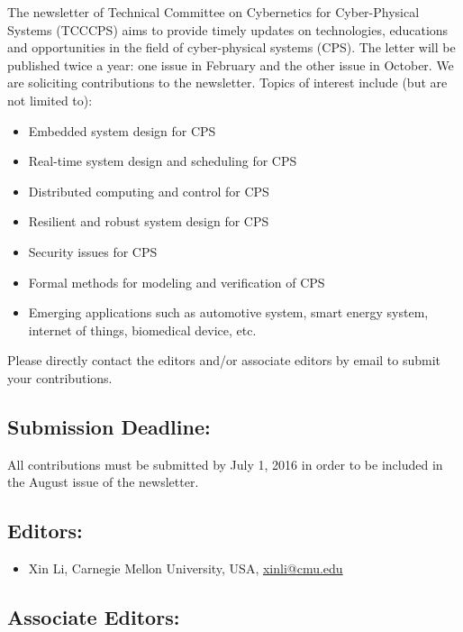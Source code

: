 

The newsletter of Technical Committee on Cybernetics for Cyber-Physical Systems (TCCCPS) aims to provide timely updates on technologies, 
educations and opportunities in the field of cyber-physical systems (CPS).
The letter will be published twice a year: one issue in February and the other issue in October.
We are soliciting contributions to the newsletter. Topics of interest include (but are not limited to):

\begin{itemize}
    \item Embedded system design for CPS
    \item Real-time system design and scheduling for CPS
    \item Distributed computing and control for CPS
    \item Resilient and robust system design for CPS
    \item Security issues for CPS
    \item Formal methods for modeling and verification of CPS
    \item Emerging applications such as automotive system, smart energy system, internet of things, biomedical device, etc.
\end{itemize}

Please directly contact the editors and/or associate editors by email to submit your contributions.

\subsection*{Submission Deadline:}

All contributions must be submitted by July 1, 2016 in order to be included in the August issue of the newsletter.

\subsection*{Editors:}
\begin{itemize}
    \item Xin Li, Carnegie Mellon University, USA, \href{mailto:xinli@cmu.edu}{xinli@cmu.edu}
\end{itemize}

\subsection*{Associate Editors:}

